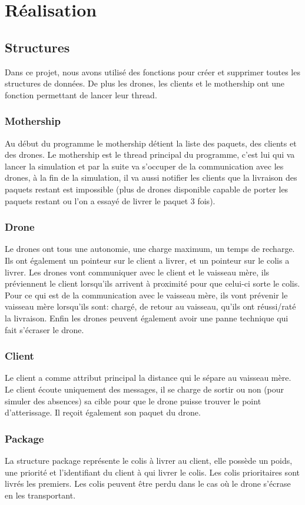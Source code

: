 \documentclass[article, backcover, french, nodocumentinfo]{upmethodology-document}
\begin{document}
	\section{Réalisation}
		\subsection{Structures}
			Dans ce projet, nous avons utilisé des fonctions pour créer et supprimer toutes les structures de données.
			De plus les drones, les clients et le mothership ont une fonction permettant de lancer leur thread.
			\subsubsection{Mothership}
			Au début du programme le mothership détient la liste des paquets, des clients et des drones.
			Le mothership est le thread principal du programme, c'est lui qui va lancer la simulation et par la suite va s'occuper de
			la communication avec les drones, à la fin de la simulation, il va aussi notifier les clients que la livraison des paquets
			restant est impossible (plus de drones disponible capable de porter les paquets restant ou l'on a essayé de livrer le paquet 3 fois).
			\subsubsection{Drone}
			Le drones ont tous une autonomie, une charge maximum, un temps de recharge. Ils ont également un pointeur sur le client a livrer,
			et un pointeur sur le colis a livrer.
			Les drones vont communiquer avec le client et le vaisseau mère, ils préviennent le client lorsqu'ils arrivent à proximité pour que
			celui-ci sorte le colis. Pour ce qui est de la communication avec le vaisseau mère, ils vont prévenir le vaisseau mère lorsqu'ils sont:
			chargé, de retour au vaisseau, qu'ils ont réussi/raté la livraison.
			Enfin les drones peuvent également avoir une panne technique qui fait s'écraser le drone.
			\subsubsection{Client}
			Le client a comme attribut principal la distance qui le sépare au vaisseau mère. Le client écoute uniquement des messages,
			il se charge de sortir ou non (pour simuler des absences) sa cible pour que le drone puisse trouver le point d'atterissage.
			Il reçoit également son paquet du drone.
			\subsubsection{Package}
			La structure package représente le colis à livrer au client, elle possède un poids, une priorité et l'identifiant du client à qui livrer le colis.
			Les colis prioritaires sont livrés les premiers. Les colis peuvent être perdu dans le cas où le drone s'écrase en les transportant.
\end{document}
